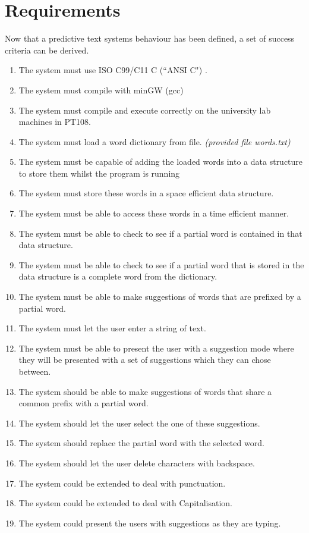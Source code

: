 \documentclass[10pt]{article} %
\begin{document}
	\section{Requirements}
		Now that a predictive text systems behaviour has been defined, a set of success criteria can be derived.
		\begin{enumerate}
			\item The system must use ISO C99/C11 C (``ANSI C") .
			\item The system must compile with minGW (gcc)
			\item The system must compile and execute correctly on the university lab machines in PT108.
			\item The system must load a word dictionary from file. \textit{(provided file words.txt)}
			
			\item The system must be capable of adding the loaded words into a data structure to store them whilst the program is running
			\item The system must store these words in a space efficient data structure.
			\item The system must be able to access these words in a time efficient manner.
			
			\item The system must be able to check to see if a partial word is contained in that data structure.
			\item The system must be able to check to see if a partial word that is stored in the data structure is a complete word from the dictionary.
			\item The system must be able to make suggestions of words that are prefixed by a partial word.

			
			\item The system must let the user enter a string of text.
			\item The system must be able to present the user with a suggestion mode where they will be presented with a set of suggestions which they can chose between.
			
			\item \label{criteria:commonprefix}The system should be able to make suggestions of words that share a common prefix with a partial word.
			\item The system should let the user select the one of these suggestions.
			\item The system should replace the partial word with the selected word.
			\item The system should let the user delete characters with backspace.

			\item \label{criteria:punctuation} The system could be extended to deal with punctuation.
			\item \label{criteria:capitals} The system could be extended to deal with Capitalisation.
			\item The system could present the users with suggestions as they are typing.
			
		\end{enumerate}
\end{document}
